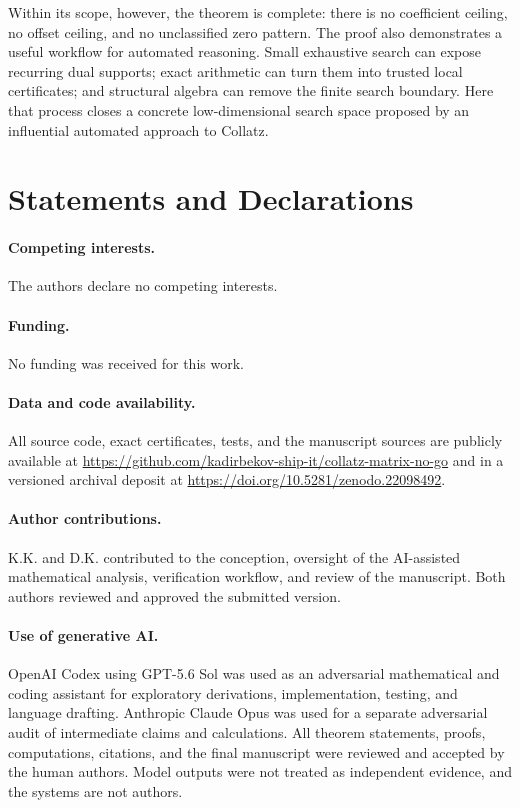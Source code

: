 \documentclass[11pt]{article}
\theoremstyle{definition}
\begin{document}
Within its scope, however, the theorem is complete: there is no coefficient
ceiling, no offset ceiling, and no unclassified zero pattern.  The proof also
demonstrates a useful workflow for automated reasoning.  Small exhaustive
search can expose recurring dual supports; exact arithmetic can turn them
into trusted local certificates; and structural algebra can remove the
finite search boundary.  Here that process closes a concrete low-dimensional
search space proposed by an influential automated approach to Collatz.

\section*{Statements and Declarations}

\paragraph{Competing interests.}
The authors declare no competing interests.

\paragraph{Funding.}
No funding was received for this work.

\paragraph{Data and code availability.}
All source code, exact certificates, tests, and the manuscript sources are
publicly available at
\url{https://github.com/kadirbekov-ship-it/collatz-matrix-no-go} and in a
versioned archival deposit at
\url{https://doi.org/10.5281/zenodo.22098492}.

\paragraph{Author contributions.}
K.K. and D.K. contributed to the conception, oversight of the AI-assisted
mathematical analysis, verification workflow, and review of the manuscript.
Both authors reviewed and approved the submitted version.

\paragraph{Use of generative AI.}
OpenAI Codex using GPT-5.6 Sol was used as an adversarial mathematical and
coding assistant for exploratory derivations, implementation, testing, and
language drafting.  Anthropic Claude Opus was used for a separate adversarial
audit of intermediate claims and calculations.  All theorem statements,
proofs, computations, citations, and the final manuscript were reviewed and
accepted by the human authors.  Model outputs were not treated as independent
evidence, and the systems are not authors.
\end{document}
